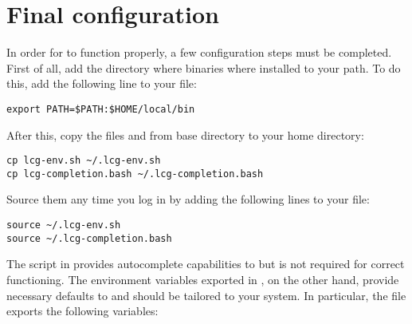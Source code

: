 \section{Final configuration}
\label{sec:configuration}
In order for \progname to function properly, a few configuration steps
must be completed. First of all, add the directory where \progname
binaries where installed to your path. To do this, add the following
line to your  file:
\begin{lstlisting}
export PATH=$PATH:$HOME/local/bin
\end{lstlisting}
After this, copy the files  and
 from \progname base directory to your
home directory:
\begin{lstlisting}
cp lcg-env.sh ~/.lcg-env.sh
cp lcg-completion.bash ~/.lcg-completion.bash
\end{lstlisting}
Source them any time you log in by adding the following lines to your
 file:
\begin{lstlisting}
source ~/.lcg-env.sh
source ~/.lcg-completion.bash
\end{lstlisting}
The script in  provides autocomplete
capabilities to \progname but is not required for correct
functioning. The environment variables exported in
, on the other hand, provide necessary defaults
to \progname and should be tailored to your system. In particular, the
file exports the following variables:
